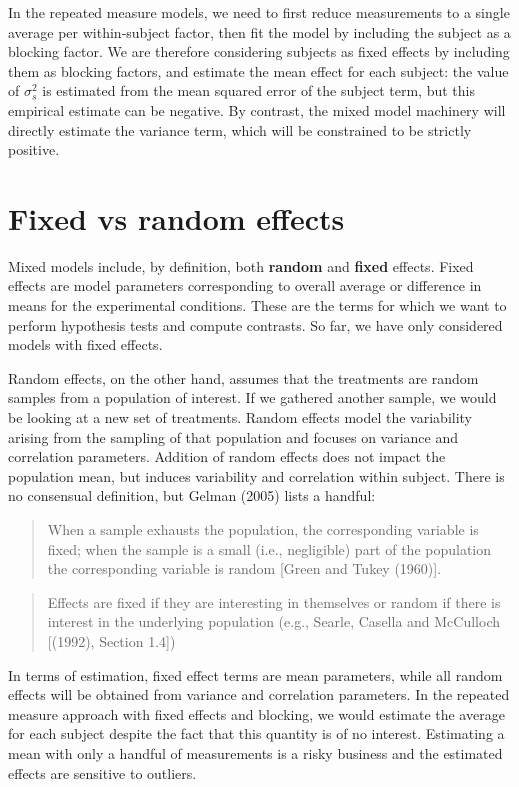 \documentclass[
  11pt,
  letterpaper,
]{scrbook}
\theoremstyle{definition}
\theoremstyle{remark}
\begin{document}
In the repeated measure models, we need to first reduce measurements to
a single average per within-subject factor, then fit the model by
including the subject as a blocking factor. We are therefore considering
subjects as fixed effects by including them as blocking factors, and
estimate the mean effect for each subject: the value of \(\sigma^2_s\)
is estimated from the mean squared error of the subject term, but this
empirical estimate can be negative. By contrast, the mixed model
machinery will directly estimate the variance term, which will be
constrained to be strictly positive.

\hypertarget{fixed-vs-random-effects}{%
\section{Fixed vs random effects}\label{fixed-vs-random-effects}}

Mixed models include, by definition, both \textbf{random} and
\textbf{fixed} effects. Fixed effects are model parameters corresponding
to overall average or difference in means for the experimental
conditions. These are the terms for which we want to perform hypothesis
tests and compute contrasts. So far, we have only considered models with
fixed effects.

Random effects, on the other hand, assumes that the treatments are
random samples from a population of interest. If we gathered another
sample, we would be looking at a new set of treatments. Random effects
model the variability arising from the sampling of that population and
focuses on variance and correlation parameters. Addition of random
effects does not impact the population mean, but induces variability and
correlation within subject. There is no consensual definition, but
Gelman (2005) lists a handful:

\begin{quote}
When a sample exhausts the population, the corresponding variable is
fixed; when the sample is a small (i.e., negligible) part of the
population the corresponding variable is random {[}Green and Tukey
(1960){]}.
\end{quote}

\begin{quote}
Effects are fixed if they are interesting in themselves or random if
there is interest in the underlying population (e.g., Searle, Casella
and McCulloch {[}(1992), Section 1.4{]})
\end{quote}

In terms of estimation, fixed effect terms are mean parameters, while
all random effects will be obtained from variance and correlation
parameters. In the repeated measure approach with fixed effects and
blocking, we would estimate the average for each subject despite the
fact that this quantity is of no interest. Estimating a mean with only a
handful of measurements is a risky business and the estimated effects
are sensitive to outliers.
\end{document}

